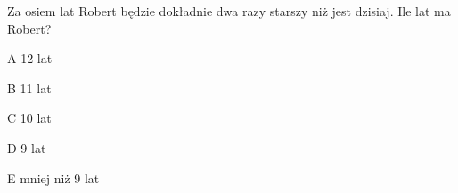 \begin{tresc}
Za osiem lat Robert będzie dokładnie dwa razy starszy niż jest dzisiaj. Ile lat ma Robert?
\end{tresc}
\begin{wariant}{A} 12 lat \end{wariant}
\begin{wariant}{B} 11 lat \end{wariant}
\begin{wariant}{C} 10 lat \end{wariant}
\begin{wariant}{D} 9 lat \end{wariant}
\begin{wariant}{E} mniej niż 9 lat \end{wariant}
